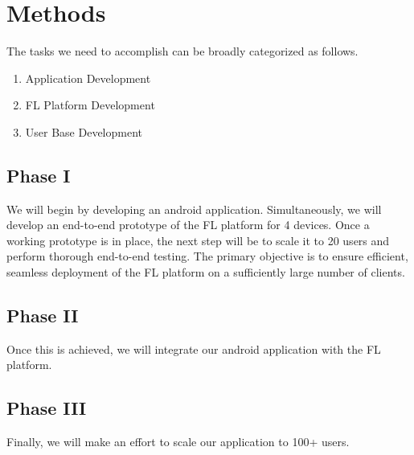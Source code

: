 \section{Methods}
    The tasks we need to accomplish can be broadly categorized as follows. \newline

    \begin{enumerate}
        \item Application Development
        \item FL Platform Development
        \item User Base Development
    \end{enumerate}

    \subsection{Phase I}
    We will begin by developing an android application.
    Simultaneously, we will develop an end-to-end prototype of the FL platform for 4 devices.
    Once a working prototype is in place, the next step will be to scale it to 20 users and perform thorough end-to-end testing.
    The primary objective is to ensure efficient, seamless deployment of the FL platform on a sufficiently large number of clients.
    \subsection{Phase II}
    Once this is achieved, we will integrate our android application with the FL platform.
    \subsection{Phase III}
    Finally, we will make an effort to scale our application to 100+ users.


